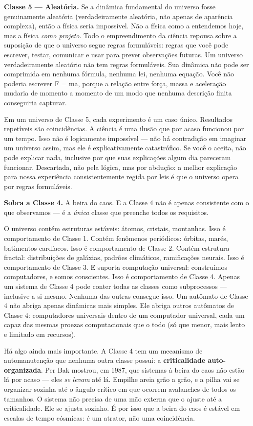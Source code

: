 \documentclass[11pt, twoside, openright]{book}
\begin{document}
\textbf{Classe 5 --- Aleatória.} Se a dinâmica fundamental do universo fosse genuinamente aleatória (verdadeiramente aleatória, não apenas de aparência complexa), então a física seria impossível. Não a física como a entendemos hoje, mas a física \textit{como projeto}. Todo o empreendimento da ciência repousa sobre a suposição de que o universo segue regras formuláveis: regras que você pode escrever, testar, comunicar e usar para prever observações futuras. Um universo verdadeiramente aleatório não tem regras formuláveis. Sua dinâmica não pode ser comprimida em nenhuma fórmula, nenhuma lei, nenhuma equação. Você não poderia escrever F = ma, porque a relação entre força, massa e aceleração mudaria de momento a momento de um modo que nenhuma descrição finita conseguiria capturar.

Em um universo de Classe 5, cada experimento é um caso único. Resultados repetíveis são coincidências. A ciência é uma ilusão que por acaso funcionou por um tempo. Isso não é logicamente impossível --- não há contradição em imaginar um universo assim, mas ele é explicativamente catastrófico. Se você o aceita, não pode explicar nada, inclusive por que suas explicações algum dia pareceram funcionar. Descartada, não pela lógica, mas por abdução: a melhor explicação para nossa experiência consistentemente regida por leis é que o universo opera por regras formuláveis.

\textbf{Sobra a Classe 4.} A beira do caos. E a Classe 4 não é apenas consistente com o que observamos --- é a \textit{única} classe que preenche todos os requisitos.

O universo contém estruturas estáveis: átomos, cristais, montanhas. Isso é comportamento de Classe 1. Contém fenômenos periódicos: órbitas, marés, batimentos cardíacos. Isso é comportamento de Classe 2. Contém estrutura fractal: distribuições de galáxias, padrões climáticos, ramificações neurais. Isso é comportamento de Classe 3. E suporta computação universal: construímos computadores, e somos conscientes. Isso é comportamento de Classe 4. Apenas um sistema de Classe 4 pode conter todas as classes como subprocessos --- inclusive a si mesmo. Nenhuma das outras consegue isso. Um autômato de Classe 4 não abriga apenas dinâmicas mais simples. Ele abriga outros autômatos de Classe 4: computadores universais dentro de um computador universal, cada um capaz das mesmas proezas computacionais que o todo (só que menor, mais lento e limitado em recursos).

Há algo ainda mais importante. A Classe 4 tem um mecanismo de automanutenção que nenhuma outra classe possui: a \textbf{criticalidade auto-organizada}. Per Bak mostrou, em 1987, que sistemas à beira do caos não estão lá por acaso --- eles \textit{se levam} até lá. Empilhe areia grão a grão, e a pilha vai se organizar sozinha até o ângulo crítico em que ocorrem avalanches de todos os tamanhos. O sistema não precisa de uma mão externa que o ajuste até a criticalidade. Ele se ajusta sozinho. É por isso que a beira do caos é estável em escalas de tempo cósmicas: é um atrator, não uma coincidência.
\end{document}
